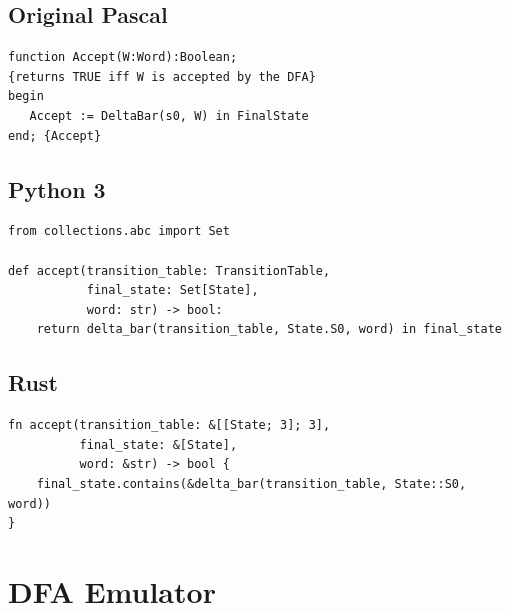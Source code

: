 \subsection*{Original Pascal}
\begin{verbatim}
function Accept(W:Word):Boolean;
{returns TRUE iff W is accepted by the DFA}
begin
   Accept := DeltaBar(s0, W) in FinalState
end; {Accept}
\end{verbatim}

\subsection*{Python 3}
\begin{verbatim}
from collections.abc import Set

def accept(transition_table: TransitionTable,
           final_state: Set[State],
           word: str) -> bool:
    return delta_bar(transition_table, State.S0, word) in final_state
\end{verbatim}

\subsection*{Rust}
\begin{verbatim}
fn accept(transition_table: &[[State; 3]; 3],
          final_state: &[State],
          word: &str) -> bool {
    final_state.contains(&delta_bar(transition_table, State::S0, word))
}
\end{verbatim}

\section{DFA Emulator}

